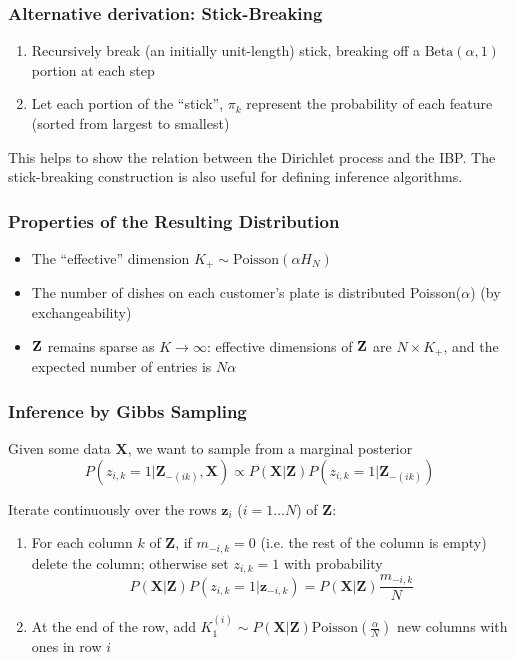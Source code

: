 \documentclass[13pt]{beamer}
\begin{document}
\begin{frame}
\frametitle{Alternative derivation: Stick-Breaking}

\begin{enumerate}
\item Recursively break (an initially unit-length) stick, breaking off a $\text{Beta}(\alpha, 1)$ portion at each step
\item Let each portion of the ``stick'', $\pi_k$ represent the probability of each feature (sorted from largest to smallest)
\end{enumerate}

This helps to show the relation between the Dirichlet process and the IBP. The stick-breaking construction is also useful for defining inference algorithms.

\end{frame}
\begin{frame}
\frametitle{Properties of the Resulting Distribution}
\begin{itemize}
\item The ``effective'' dimension $K_+ \sim \text{Poisson}(\alpha H_N)$
\item The number of dishes on each customer's plate is distributed Poisson($\alpha$) (by exchangeability)
\item $\bf{Z}$ remains sparse as $K\rightarrow \infty$: effective dimensions of $\bf{Z}$ are $N \times K_+$, and the expected number of entries is $N\alpha$
\end{itemize}

\end{frame}
\begin{frame}
\frametitle{Inference by Gibbs Sampling}
Given some data $\mathbf{X}$, we want to sample from a marginal posterior 
\[
    P(z_{i,k} = 1 | \mathbf{Z}_{-(ik)},\mathbf{X} ) \propto P(\mathbf{X}| \mathbf{Z}) P(z_{i,k} = 1 | \mathbf{Z}_{-(ik)} )
\]

Iterate continuously over the rows $\mathbf{z}_i$ ($i=1\ldots N$) of $\mathbf{Z}$:
\begin{enumerate}
    \item For each column $k$ of $\mathbf{Z}$, if $m_{-i,k} = 0$ (i.e. the rest of the column is empty) delete the column; 
        otherwise set $z_{i,k}=1$ with probability $$P(\mathbf{X}|\mathbf{Z}) P(z_{i,k}=1 | \mathbf{z}_{-i,k}) =  P(\mathbf{X}|\mathbf{Z})\frac{m_{-i,k}}{N}$$
    \item At the end of the row, add $K_1^{(i)} \sim P(\mathbf{X}|\mathbf{Z}) \text{Poisson}(\frac{\alpha}{N})$ new columns with ones in row $i$
\end{enumerate}

\end{frame}
\end{document}
